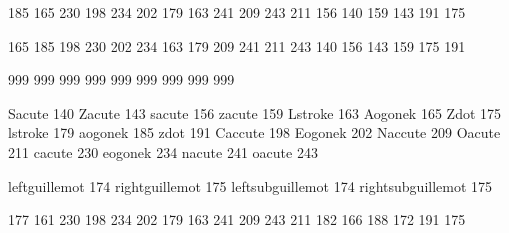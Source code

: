  185 165  %
 230 198  %
 234 202  %
 179 163  %
 241 209  %
 243 211  %
 156 140  %
 159 143  %
 191 175  %

 165 185  %
 198 230  %
 202 234  %
 163 179  %
 209 241  %
 211 243  %
 140 156  %
 143 159  %
 175 191  %

\stopmapping 

\startmapping[pl1]

 999  %
 999  %
 999  %
 999  %
 999  %
 999  %
 999  %
 999  %
 999  %

\stopmapping 

\startencoding[pl1]

 Sacute  140
 Zacute  143
 sacute  156
 zacute  159
 Lstroke 163
 Aogonek 165
 Zdot    175
 lstroke 179
 aogonek 185
 zdot    191
 Caccute 198
 Eogonek 202
 Naccute 209
 Oacute  211
 cacute  230
 eogonek 234
 nacute  241
 oacute  243

\stopencoding 

\startencoding[pl1]

 leftguillemot      174  %
 rightguillemot     175  %
 leftsubguillemot   174  %
 rightsubguillemot  175  %

\stopencoding


\startmapping[pl2]

 177 161  %
 230 198  %
 234 202  %
 179 163  %
 241 209  %
 243 211  %
 182 166  %
 188 172  %
 191 175  %

